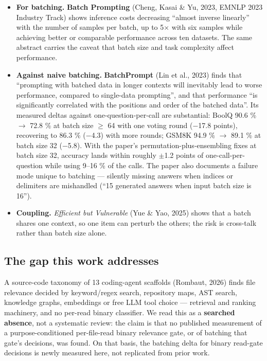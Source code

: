 \documentclass[11pt,a4paper]{article}
\begin{document}
\begin{itemize}
\item \textbf{For batching.} \textbf{Batch Prompting} (Cheng, Kasai \& Yu, 2023, EMNLP 2023 Industry Track)\cite{ref3} shows inference costs decreasing ``almost inverse linearly'' with the number of samples per batch, up to 5$\times$ with six samples while achieving better or comparable performance across ten datasets. The same abstract carries the caveat that batch size and task complexity affect performance.
\item \textbf{Against naive batching.} \textbf{BatchPrompt} (Lin et al., 2023)\cite{ref6} finds that ``prompting with batched data in longer contexts will inevitably lead to worse performance, compared to single-data prompting'', and that performance ``is significantly correlated with the positions and order of the batched data''. Its measured deltas against one-question-per-call are substantial: BoolQ 90.6 \% $\to$ 72.8 \% at batch size $\ge$ 64 with one voting round ($-$17.8 points), recovering to 86.3 \% ($-$4.3) with more rounds; GSM8K 94.9 \% $\to$ 89.1 \% at batch size 32 ($-$5.8). With the paper's permutation-plus-ensembling fixes at batch size 32, accuracy lands within roughly $\pm$1.2 points of one-call-per-question while using 9--16 \% of the calls. The paper also documents a failure mode unique to batching --- silently missing answers when indices or delimiters are mishandled (``15 generated answers when input batch size is 16'').
\item \textbf{Coupling.} \emph{Efficient but Vulnerable} (Yue \& Yao, 2025)\cite{ref13} shows that a batch shares one context, so one item can perturb the others; the risk is cross-talk rather than batch size alone.
\end{itemize}

\subsection{The gap this work addresses}

A source-code taxonomy of 13 coding-agent scaffolds (Rombaut, 2026)\cite{ref10} finds file relevance decided by keyword/regex search, repository maps, AST search, knowledge graphs, embeddings or free LLM tool choice --- retrieval and ranking machinery, and no per-read binary classifier. We read this as a \textbf{searched absence}, not a systematic review: the claim is that no published measurement of a purpose-conditioned per-file-read binary relevance gate, or of batching that gate's decisions, was found. On that basis, the batching delta for binary read-gate decisions is newly measured here, not replicated from prior work.
\end{document}
